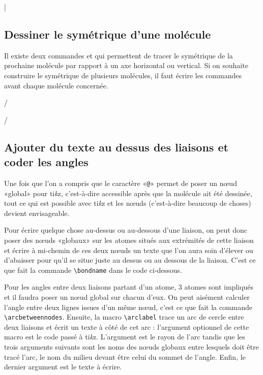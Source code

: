 \documentclass[10pt,french]{article}
\makeatletter
\newcommand\make@car@active[1]{%
	\catcode`#1\active
	\begingroup
		\lccode`\~`#1\relax
		\lowercase{\endgroup\def~}%
}
\newif\if@exstar
\newcommand\exemple{%
	\begingroup
	\parskip\z@
	\@makeother\;\@makeother\!\@makeother\?\@makeother\:%
	\@ifstar{\@exstartrue\exemple@}{\@exstarfalse\exemple@}}
\newcommand\exemple@[2][65]{%
	\medbreak\noindent
	\begingroup
		\let\do\@makeother\dospecials
		\make@car@active\ { {}}%
		\make@car@active\^^M{\par\leavevmode}%
		\make@car@active\^^I{\space\space}%
		\make@car@active\,{\leavevmode\kern\z@\string,}%
		\make@car@active\-{\leavevmode\kern\z@\string-}%
		\make@car@active\>{\leavevmode\kern\z@\string>}%
		\make@car@active\<{\leavevmode\kern\z@\string<}%
		\exemple@@{#1}{#2}%
}
\newcommand\exemple@@[3]{%
	\def\@tempa##1#3{\exemple@@@{#1}{#2}{##1}}%
	\@tempa
}
\newcommand\exemple@@@[3]{%
	\xdef\the@code{#3}%
	\endgroup
	\if@exstar
		\begingroup
			\fboxrule0.4pt
			\let\breakboxparindent\z@
			\def\bkvz@bottom{\hrule\@height\fboxrule}%
			\let\bkvz@before@breakbox\relax
			\def\bkvz@set@linewidth{\advance\linewidth\dimexpr-2\fboxrule-2\fboxsep}%
			\def\bkvz@left{\vrule\@width\fboxrule\hskip\fboxsep}%
			\def\bkvz@right{\hskip\fboxsep\vrule\@width\fboxrule}%
			\def\bkvz@top{\hbox to \hsize{%
				\vrule\@width\fboxrule\@height\fboxrule
				\leaders\bkvz@bottom\hfill
				\sffamily
				\fboxsep\z@
				\colorbox{black}{\kern0.25em\color{white}\footnotesize\lower0.5ex\hbox{\strut#2}\kern0.25em}%
				\leaders\bkvz@bottom\hfill
				\vrule\@width\fboxrule\@height\fboxrule}}%
			\breakbox
				\kern.5ex\relax
				\ttfamily\footnotesize\the@code\par
				\normalfont
				\kern3pt
				\hrule height0.1pt width\linewidth depth0.1pt
				\vskip5pt
				\rightskip0pt plus 1fill
				\everypar{{\color{lightgray}\rlap{\vrule height0.1pt width\linewidth depth0.1pt}}\hskip0pt plus 1fill}%
				\newlinechar`\^^M\everyeof{\noexpand}\scantokens{#3}\par
			\endbreakbox
		\endgroup
	\else
		\vskip0.5ex
		\boxput*(0,1)
			{\fboxsep\z@
			\hbox{\sffamily\colorbox{black}{\leavevmode\kern0.25em{\color{white}\footnotesize\strut#2}\kern0.25em}}%
			}%
			{\fboxsep5pt
			\fbox{%
				$\vcenter{\hsize\dimexpr0.#1\linewidth-\fboxsep-\fboxrule\relax
					\kern5pt\parskip0pt \ttfamily\footnotesize\the@code}%
				\vcenter{\kern5pt\hsize\dimexpr\linewidth-0.#1\linewidth-\fboxsep-\fboxrule\relax
					\everypar{{\color{lightgray}\rlap{\vrule height0.1pt width\dimexpr\linewidth-0.#1\linewidth-\fboxsep-\fboxrule depth0.1pt}}}%
					\footnotesize\newlinechar`\^^M\everyeof{\noexpand}\scantokens{#3}}$%
				}%
			}%
	\fi
	\medbreak
	\endgroup
}
\newcommand\falseverb[1]{{\ttfamily\detokenize\expandafter{\string#1}}}
\let\do\@makeother\dospecials
\newcommand\TIKZ{ti\textit kz\xspace}
\makeatother
\begin{document}
|

\subsection{Dessiner le symétrique d'une molécule}\label{retournement}
Il existe deux commandes \falseverb{\hflipnext} et \falseverb{\vflipnext} qui permettent de tracer le symétrique de la prochaine molécule par rapport à un axe horizontal ou vertical. Si on souhaite construire le symétrique de plusieurs molécules, il faut écrire les commandes avant chaque molécule concernée.

\exemple{Symétriques}/%

\vflipnext%
\medskip

\hflipnext%
/

\subsection{Ajouter du texte au dessus des liaisons et coder les angles}
Une fois que l'on a compris que le caractère «\verb-@-» permet de poser un nœud «global» pour \TIKZ, c'est-à-dire accessible après que la molécule ait été dessinée, tout ce qui est possible avec \TIKZ et les nœuds (c'est-à-dire beaucoup de choses) devient envisageable.

Pour écrire quelque chose au-dessus ou au-dessous d'une liaison, on peut donc poser des nœuds «globaux» sur les atomes situés aux extrémités de cette liaison et écrire à mi-chemin de ces deux nœuds un texte que l'on aura soin d'élever ou d'abaisser pour qu'il se situe juste au dessus ou au dessous de la liaison. C'est ce que fait la commande \verb-\bondname- dans le code ci-dessous.

Pour les angles entre deux liaisons partant d'un atome, 3 atomes sont impliqués et il faudra poser un nœud global sur chacun d'eux. On peut aisément calculer l'angle entre deux lignes issues d'un même nœud, c'est ce que fait la commande \verb-\arcbetweennodes-. Ensuite, la macro \verb-\arclabel- trace un arc de cercle entre deux liaisons et écrit un texte à côté de cet arc : l'argument optionnel de cette macro est le code passé à \TIKZ. L'argument  est le rayon de l'arc tandis que les trois arguments suivants sont les noms des nœuds globaux entre lesquels doit être tracé l'arc, le nom du milieu devant être celui du sommet de l'angle. Enfin, le dernier argument est le texte à écrire.
\end{document}
